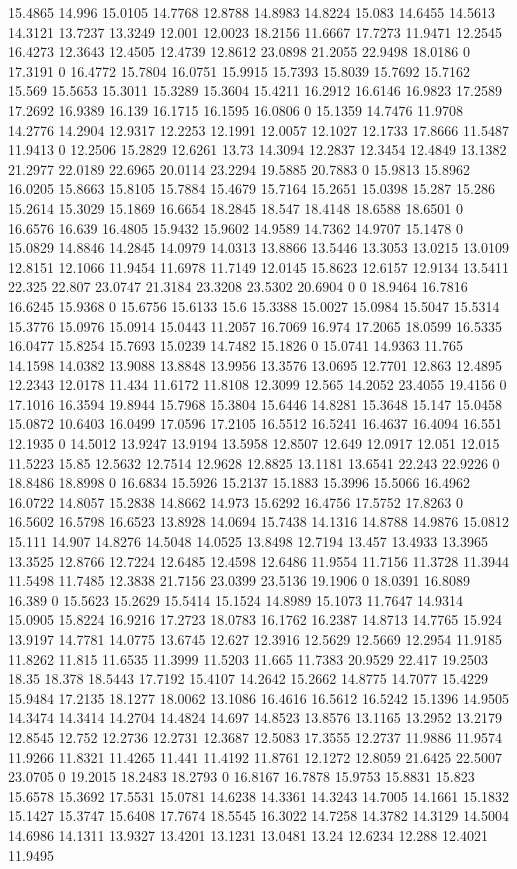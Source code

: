 15.4865 14.996 15.0105 14.7768 12.8788 14.8983 14.8224 15.083 14.6455 14.5613 14.3121 13.7237 13.3249 12.001 12.0023 18.2156 11.6667 17.7273 11.9471 12.2545 16.4273 12.3643 12.4505 12.4739 12.8612 23.0898 21.2055 22.9498 18.0186 0 17.3191 0 16.4772 15.7804 16.0751 15.9915 15.7393 15.8039 15.7692 15.7162 15.569 15.5653 15.3011 15.3289 15.3604 15.4211 16.2912 16.6146 16.9823 17.2589 17.2692 16.9389 16.139 16.1715 16.1595 16.0806 0 15.1359 14.7476 11.9708 14.2776 14.2904 12.9317 12.2253 12.1991 12.0057 12.1027 12.1733 17.8666 11.5487 11.9413 0 12.2506 15.2829 12.6261 13.73 14.3094 12.2837 12.3454 12.4849 13.1382 21.2977 22.0189 22.6965 20.0114 23.2294 19.5885 20.7883 0 15.9813 15.8962 16.0205 15.8663 15.8105 15.7884 15.4679 15.7164 15.2651 15.0398 15.287 15.286 15.2614 15.3029 15.1869 16.6654 18.2845 18.547 18.4148 18.6588 18.6501 0 16.6576 16.639 16.4805 15.9432 15.9602 14.9589 14.7362 14.9707 15.1478 0 15.0829 14.8846 14.2845 14.0979 14.0313 13.8866 13.5446 13.3053 13.0215 13.0109 12.8151 12.1066 11.9454 11.6978 11.7149 12.0145 15.8623 12.6157 12.9134 13.5411 22.325 22.807 23.0747 21.3184 23.3208 23.5302 20.6904 0 0 18.9464 16.7816 16.6245 15.9368 0 15.6756 15.6133 15.6 15.3388 15.0027 15.0984 15.5047 15.5314 15.3776 15.0976 15.0914 15.0443 11.2057 16.7069 16.974 17.2065 18.0599 16.5335 16.0477 15.8254 15.7693 15.0239 14.7482 15.1826 0 15.0741 14.9363 11.765 14.1598 14.0382 13.9088 13.8848 13.9956 13.3576 13.0695 12.7701 12.863 12.4895 12.2343 12.0178 11.434 11.6172 11.8108 12.3099 12.565 14.2052 23.4055 19.4156 0 17.1016 16.3594 19.8944 15.7968 15.3804 15.6446 14.8281 15.3648 15.147 15.0458 15.0872 10.6403 16.0499 17.0596 17.2105 16.5512 16.5241 16.4637 16.4094 16.551 12.1935 0 14.5012 13.9247 13.9194 13.5958 12.8507 12.649 12.0917 12.051 12.015 11.5223 15.85 12.5632 12.7514 12.9628 12.8825 13.1181 13.6541 22.243 22.9226 0 18.8486 18.8998 0 16.6834 15.5926 15.2137 15.1883 15.3996 15.5066 16.4962 16.0722 14.8057 15.2838 14.8662 14.973 15.6292 16.4756 17.5752 17.8263 0 16.5602 16.5798 16.6523 13.8928 14.0694 15.7438 14.1316 14.8788 14.9876 15.0812 15.111 14.907 14.8276 14.5048 14.0525 13.8498 12.7194 13.457 13.4933 13.3965 13.3525 12.8766 12.7224 12.6485 12.4598 12.6486 11.9554 11.7156 11.3728 11.3944 11.5498 11.7485 12.3838 21.7156 23.0399 23.5136 19.1906 0 18.0391 16.8089 16.389 0 15.5623 15.2629 15.5414 15.1524 14.8989 15.1073 11.7647 14.9314 15.0905 15.8224 16.9216 17.2723 18.0783 16.1762 16.2387 14.8713 14.7765 15.924 13.9197 14.7781 14.0775 13.6745 12.627 12.3916 12.5629 12.5669 12.2954 11.9185 11.8262 11.815 11.6535 11.3999 11.5203 11.665 11.7383 20.9529 22.417 19.2503 18.35 18.378 18.5443 17.7192 15.4107 14.2642 15.2662 14.8775 14.7077 15.4229 15.9484 17.2135 18.1277 18.0062 13.1086 16.4616 16.5612 16.5242 15.1396 14.9505 14.3474 14.3414 14.2704 14.4824 14.697 14.8523 13.8576 13.1165 13.2952 13.2179 12.8545 12.752 12.2736 12.2731 12.3687 12.5083 17.3555 12.2737 11.9886 11.9574 11.9266 11.8321 11.4265 11.441 11.4192 11.8761 12.1272 12.8059 21.6425 22.5007 23.0705 0 19.2015 18.2483 18.2793 0 16.8167 16.7878 15.9753 15.8831 15.823 15.6578 15.3692 17.5531 15.0781 14.6238 14.3361 14.3243 14.7005 14.1661 15.1832 15.1427 15.3747 15.6408 17.7674 18.5545 16.3022 14.7258 14.3782 14.3129 14.5004 14.6986 14.1311 13.9327 13.4201 13.1231 13.0481 13.24 12.6234 12.288 12.4021 11.9495 